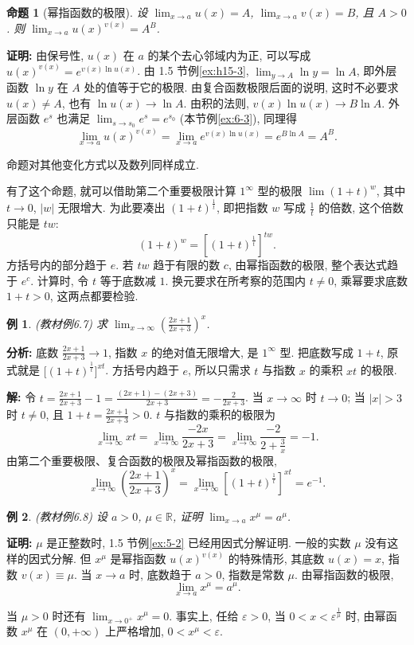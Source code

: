 \documentclass[UTF8,openany]{ctexbook}
\theoremstyle{chinesetextbook}
\newtheorem{example}{例}[section]
\newenvironment{cnproof}{\par\indent\textbf{证明:} \ignorespaces}{\par}
\newenvironment{cnsolution}{\par\indent\textbf{解:} \ignorespaces}{\par}
\newtheorem*{propositionsingle}{命题}
\begin{document}
\begin{propositionsingle}[幂指函数的极限]
设 $\displaystyle\lim_{x\to a}u(x)=A$, $\displaystyle\lim_{x\to a}v(x)=B$, 且 $A>0$. 则 $\displaystyle\lim_{x\to a}u(x)^{v(x)}=A^B$.
\end{propositionsingle}
\begin{cnproof}
由保号性, $u(x)$ 在 $a$ 的某个去心邻域内为正, 可以写成 $u(x)^{v(x)}=e^{v(x)\ln u(x)}$. 由 1.5 节例\ref{ex:h15-3}, $\displaystyle\lim_{y\to A}\ln y=\ln A$, 即外层函数 $\ln y$ 在 $A$ 处的值等于它的极限. 由复合函数极限后面的说明, 这时不必要求 $u(x)\ne A$, 也有 $\ln u(x)\to\ln A$. 由积的法则, $v(x)\ln u(x)\to B\ln A$. 外层函数 $e^s$ 也满足 $\displaystyle\lim_{s\to s_0}e^s=e^{s_0}$ (本节例\ref{ex:6-3}), 同理得
\[
\lim_{x\to a}u(x)^{v(x)}=\lim_{x\to a}e^{v(x)\ln u(x)}=e^{B\ln A}=A^B.
\]
\end{cnproof}
命题对其他变化方式以及数列同样成立.

有了这个命题, 就可以借助第二个重要极限计算 $1^\infty$ 型的极限 $\displaystyle\lim(1+t)^w$, 其中 $t\to0$, $|w|$ 无限增大. 为此要凑出 $(1+t)^{\frac1t}$, 即把指数 $w$ 写成 $\displaystyle\frac1t$ 的倍数, 这个倍数只能是 $tw$:
\[
(1+t)^w=\left[(1+t)^{\frac1t}\right]^{tw}.
\]
方括号内的部分趋于 $e$. 若 $tw$ 趋于有限的数 $c$, 由幂指函数的极限, 整个表达式趋于 $e^c$. 计算时, 令 $t$ 等于底数减 $1$. 换元要求在所考察的范围内 $t\ne0$, 乘幂要求底数 $1+t>0$, 这两点都要检验.
\begin{example}\label{ex:6-7}
\textnormal{(教材例6.7)} 求 $\displaystyle\lim_{x\to\infty}\left(\frac{2x+1}{2x+3}\right)^x$.
\end{example}
\par\indent\textbf{分析:} 底数 $\displaystyle\frac{2x+1}{2x+3}\to1$, 指数 $x$ 的绝对值无限增大, 是 $1^\infty$ 型. 把底数写成 $1+t$, 原式就是 $\bigl[(1+t)^{\frac1t}\bigr]^{xt}$. 方括号内趋于 $e$, 所以只需求 $t$ 与指数 $x$ 的乘积 $xt$ 的极限.
\begin{cnsolution}
令 $\displaystyle t=\frac{2x+1}{2x+3}-1=\frac{(2x+1)-(2x+3)}{2x+3}=-\frac2{2x+3}$. 当 $x\to\infty$ 时 $t\to0$; 当 $|x|>3$ 时 $t\ne0$, 且 $\displaystyle1+t=\frac{2x+1}{2x+3}>0$. $t$ 与指数的乘积的极限为
\[
\lim_{x\to\infty}xt=\lim_{x\to\infty}\frac{-2x}{2x+3}=\lim_{x\to\infty}\frac{-2}{2+\frac3x}=-1.
\]
由第二个重要极限、复合函数的极限及幂指函数的极限,
\[
\lim_{x\to\infty}\left(\frac{2x+1}{2x+3}\right)^x=\lim_{x\to\infty}\left[(1+t)^{\frac1t}\right]^{xt}=e^{-1}.
\]
\end{cnsolution}
\begin{example}\label{ex:6-8}
\textnormal{(教材例6.8)} 设 $a>0$, $\mu\in\mathbb R$, 证明 $\displaystyle\lim_{x\to a}x^\mu=a^\mu$.
\end{example}
\begin{cnproof}
$\mu$ 是正整数时, 1.5 节例\ref{ex:5-2} 已经用因式分解证明. 一般的实数 $\mu$ 没有这样的因式分解. 但 $x^\mu$ 是幂指函数 $u(x)^{v(x)}$ 的特殊情形, 其底数 $u(x)=x$, 指数 $v(x)\equiv\mu$. 当 $x\to a$ 时, 底数趋于 $a>0$, 指数是常数 $\mu$. 由幂指函数的极限,
\[
\lim_{x\to a}x^\mu=a^\mu.
\]
\end{cnproof}
当 $\mu>0$ 时还有 $\displaystyle\lim_{x\to0^+}x^\mu=0$. 事实上, 任给 $\varepsilon>0$, 当 $0<x<\varepsilon^{\frac1\mu}$ 时, 由幂函数 $x^\mu$ 在 $(0,+\infty)$ 上严格增加, $0<x^\mu<\varepsilon$.
\end{document}
